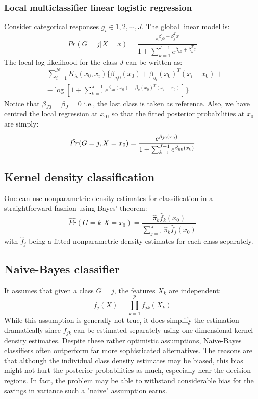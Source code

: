 \documentclass[12pt, letterpaper]{article}
\theoremstyle{definition}
\DeclarePairedDelimiter\autobracket{(}{)}
\newcommand{\br}[1]{\autobracket*{#1}}
\begin{document}
\subsubsection{Local multiclassifier linear logistic regression}
Consider categorical responses $g_i \in {1,2,\cdots, J}$. The global linear model is:
\begin{equation*}
Pr(G=j|X=x) = \frac{e^{\beta_{j0}+\beta_j^Tx}}{1+\sum_{k=1}^{J-1}e^{\beta_{k0}+\beta_k^Tx}}
\end{equation*}
The local log-likelihood for the class $J$ can be written as:
\begin{equation}
\begin{aligned}
&\sum_{i=1}^N K_\lambda(x_0, x_i) \Bigg\{\beta_{g_i0}(x_0)+ \beta_{g_i}(x_0)^T(x_i-x_0)+\\
& -\log\left[ 1+\sum_{k=1}^{J-1}e^{\beta_{k0}(x_0)+\beta_k(x_0)^T(x_i-x_0)}\right]\Bigg\}
\end{aligned}
\end{equation}
Notice that $\beta_{J0}=\beta_{J}=0$ i.e., the last class is taken as reference. Also, we have centred the local regression at $x_0$, so that the fitted posterior probabilities at $x_0$ are simply:
\begin{equation}
\hat{Pr}\br{G=j, X=x_0} = \frac{e^{\hat{\beta}_{j0}(x_0)}}{1+\sum_{k=1}^{J-1}e^{\hat{\beta}_{k0}(x_0)}}
\end{equation}

\subsection{Kernel density classification}
One can use nonparametric density estimates for classification in a straightforward fashion using Bayes' theorem:
\begin{equation}
\hat{Pr}(G=k|X=x_0) = \frac{\hat{\pi}_k \hat{f}_k(x_0)}{\sum_{j=1}^J\hat{\pi}_k \hat{f}_j(x_0)}
\end{equation}
with $\hat{f}_j$ being a fitted nonparametric density estimates for each class separately.

\subsection{Naive-Bayes classifier}
It assumes that given a class $G=j$, the features $X_k$ are independent:
\begin{equation}
f_j(X) = \prod_{k=1}^p f_{jk}(X_k)
\end{equation}
While this assumption is generally not true, it does simplify the estimation
dramatically since $f_{jk}$ can be estimated separately using one dimensional kernel density estimates.
Despite these rather optimistic assumptions, Naive-Bayes classifiers often outperform far more sophisticated alternatives. The reasons are that although the individual class density estimates may be biased, this bias might not hurt the posterior probabilities as much, especially near the decision regions. In fact, the problem may be able to withstand considerable bias for the savings in variance such a "naive" assumption earns.
\end{document}
